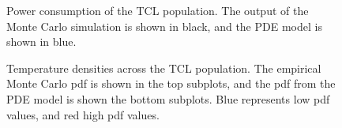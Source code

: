 \documentclass[submission,copyright,creativecommons]{eptcs}
\begin{document}
\begin{figure}[h!] 
\centering
{}  

\caption{Power consumption of the TCL population. The output of the Monte Carlo simulation is shown in black, and the PDE model is shown in blue.}
\label{fig:results_1}
\end{figure}   
\begin{figure}[h!]
\centering
{}  
\caption{Temperature densities across the TCL population. The empirical Monte Carlo pdf is shown in the top subplots, and the pdf from the PDE model is shown the bottom subplots. Blue represents low pdf values, and red high pdf values.}
\label{fig:results_2}
\end{figure} 



                 
\end{document}
